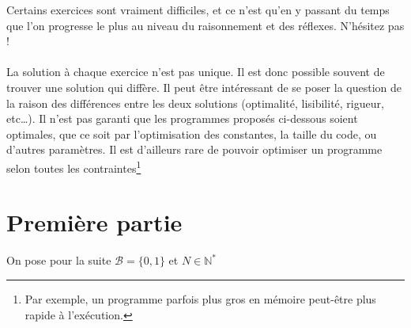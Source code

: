 \documentclass[../main.tex]{subfiles}
\begin{document}
Certains exercices sont vraiment difficiles, et ce n'est qu'en y passant du temps que l'on progresse le plus au niveau du raisonnement et des réflexes. N'hésitez pas !
\\ \\ 
La solution à chaque exercice n'est pas unique. Il est donc possible souvent de trouver une solution qui diffère. Il peut être intéressant de se poser la question de la raison des différences entre les deux solutions (optimalité, lisibilité, rigueur, etc\dots). Il n'est pas garanti que les programmes proposés ci-dessous soient optimales, que ce soit par l'optimisation des constantes, la taille du code, ou d'autres paramètres. Il est d'ailleurs rare de pouvoir optimiser un programme selon toutes les contraintes\footnote{Par exemple, un programme parfois plus gros en mémoire peut-être plus rapide à l'exécution.}
\section{Première partie}
On pose pour la suite $\mathcal{B} = \{0, 1\}$ et $N\in\mathbb{N}^{*}$
\end{document}
